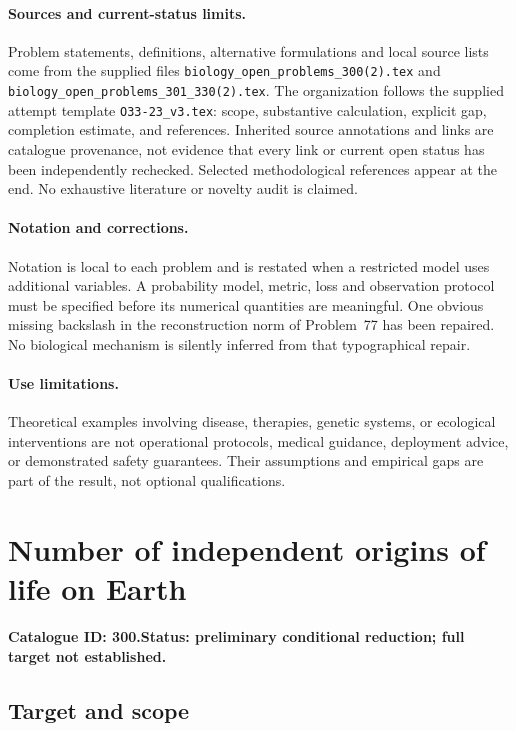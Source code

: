 \documentclass[11pt]{article}
\begin{document}
\paragraph{Sources and current-status limits.}
Problem statements, definitions, alternative formulations and local source lists
come from the supplied files
\texttt{biology\_open\_problems\_300(2).tex} and
\texttt{biology\_open\_problems\_301\_330(2).tex}.
The organization follows the supplied attempt template
\texttt{O33-23\_v3.tex}: scope, substantive calculation, explicit gap,
completion estimate, and references. Inherited source annotations and links are
catalogue provenance, not evidence that every link or current open status has
been independently rechecked. Selected methodological references appear at the
end. No exhaustive literature or novelty audit is claimed.

\paragraph{Notation and corrections.}
Notation is local to each problem and is restated when a restricted model uses
additional variables. A probability model, metric, loss and observation protocol
must be specified before its numerical quantities are meaningful. One obvious
missing backslash in the reconstruction norm of Problem~77 has been repaired.
No biological mechanism is silently inferred from that typographical repair.

\paragraph{Use limitations.}
Theoretical examples involving disease, therapies, genetic systems, or ecological
interventions are not operational protocols, medical guidance, deployment advice,
or demonstrated safety guarantees. Their assumptions and empirical gaps are part
of the result, not optional qualifications.

\setcounter{section}{299}
\section{Number of independent origins of life on Earth}
\label{prob:300}
\noindent\textbf{Catalogue ID: 300.}\quad \textbf{Status: preliminary conditional reduction; full target not established.}
\subsection{Target and scope}
\end{document}

